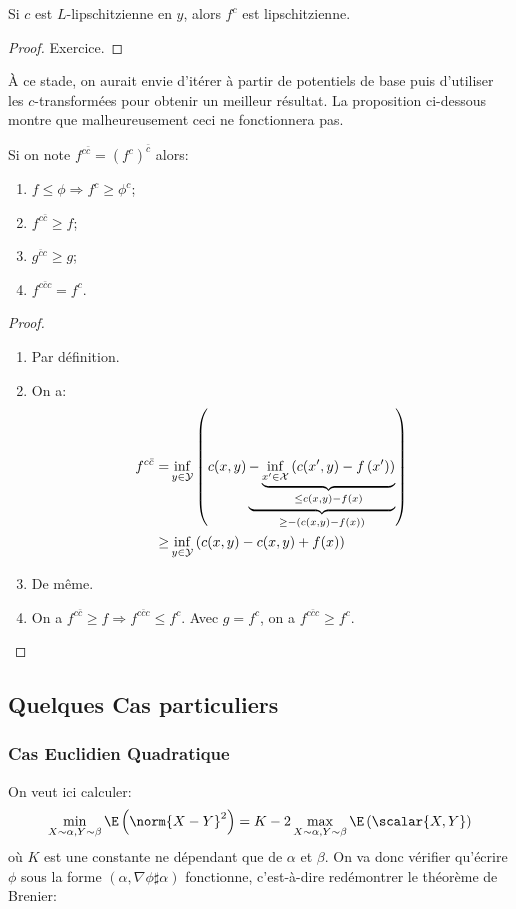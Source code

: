 \begin{proposition}
	Si $c$ est $L$-lipschitzienne en $y$, alors $f^{c}$ est lipschitzienne.
\end{proposition}
\begin{proof}
	Exercice.
\end{proof}

À ce stade, on aurait envie d'itérer à partir de potentiels de base puis d'utiliser les $c$-transformées
pour obtenir un meilleur résultat.
La proposition ci-dessous montre que malheureusement ceci ne fonctionnera pas.

\begin{proposition}
	Si on note $f^{c\bar{c}} = \left(f^{c}\right)^{\bar{c}}$ alors:
	\begin{enumerate}
		\item $f \leq \phi \Rightarrow f^{c} \geq \phi^{c}$;
		\item $f^{c\bar{c}} \geq f$;
		\item $g^{\bar{c}c} \geq g$;
		\item $f^{c\bar{c}c} = f^{c}$.
	\end{enumerate}
\end{proposition}
\begin{proof}
	\begin{enumerate}
		\item Par définition.
		\item On a:
		      \begin{align*}
			      f^{c\bar{c}} = & \inf_{y \in \mathcal{Y}} \left(c(x, y) \underbrace{- \underbrace{\inf_{x' \in \mathcal{X}} \left(c(x', y) - f\left(x'\right)\right)}_{\leq c(x, y) - f(x)}}_{\geq -\left(c(x, y) - f(x)\right)}\right) \\
			      \geq           & \inf_{y \in \mathcal{Y}} \left(c(x, y) - c(x, y) + f(x)\right)
		      \end{align*}
		\item De même.
		\item On a $f^{c\bar{c}} \geq f \Rightarrow f^{c\bar{c}c} \leq f^{c}$. Avec $g = f^{c}$, on a $f^{c\bar{c}c}\geq f^{c}$.
	\end{enumerate}
\end{proof}


\subsection{Quelques Cas particuliers}
\subsubsection{Cas Euclidien Quadratique}
On veut ici calculer:
\begin{equation*}
	\min_{X \sim \alpha, Y \sim \beta} \E\left(\norm{X - Y}^{2}\right) = K - 2 \max_{X \sim \alpha, Y \sim \beta} \E\left(\scalar{X, Y}\right)
\end{equation*}
où $K$ est une constante ne dépendant que de $\alpha$ et $\beta$.
On va donc vérifier qu'écrire $\phi$ sous la forme $(\alpha, \nabla\phi\sharp\alpha)$ fonctionne, c'est-à-dire redémontrer le théorème de Brenier:

